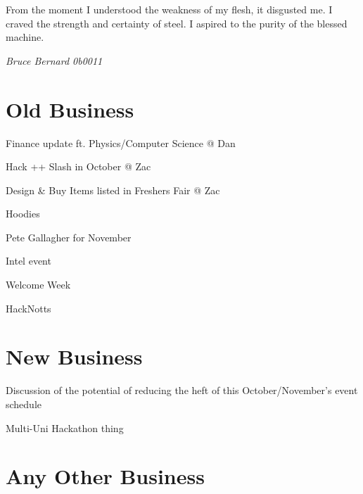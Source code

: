\documentclass[11pt,hacksoc,agenda]{meetingmins}
\begin{document}
\maketitle

\epigraph{From the moment I understood the weakness of my flesh, it disgusted me. I craved the strength and certainty of steel. I aspired to the purity of the blessed machine.}{\textit{Bruce Bernard 0b0011}}


\section{Old Business}
\begin{items}
\item {Finance update ft. Physics/Computer Science @ Dan}
\item {Hack ++ Slash in October @ Zac}
\item {Design \& Buy Items listed in Freshers Fair @ Zac}
\item {Hoodies}
\item {Pete Gallagher for November}
\item {Intel event}
\item {Welcome Week}
\item {HackNotts}
\end{items}

\section{New Business}
\begin{items}
\item {Discussion of the potential of reducing the heft of this October/November's event schedule}
\item {Multi-Uni Hackathon thing}
\end{items}

\section{Any Other Business}

\vspace{1em}
\nextmeeting{}
\end{document}
